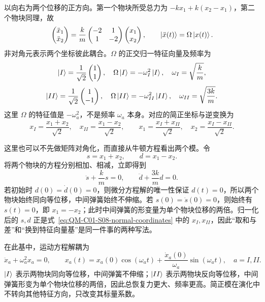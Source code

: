 \begin{checkedsolution}
以向右为两个位移的正方向。第一个物块所受总力为 $-kx_1+k(x_2-x_1)$，第二个物块同理，故
\begin{equation}
  \begin{pmatrix}\ddot x_1\\\ddot x_2\end{pmatrix}
  =\frac{k}{m}
  \begin{pmatrix}-2&1\\1&-2\end{pmatrix}
  \begin{pmatrix}x_1\\x_2\end{pmatrix},
  \qquad
  \left|\ddot x(t)\right\rangle=\Omega\left|x(t)\right\rangle.
  \label{eq:QM-C01-S08-coupled-equation}
\end{equation}
非对角元表示两个坐标彼此耦合。$\Omega$ 的正交归一特征向量及频率为
\[
  \left|I\right\rangle=\frac1{\sqrt2}\begin{pmatrix}1\\1\end{pmatrix},
  \quad \Omega\left|I\right\rangle=-\omega_I^2\left|I\right\rangle,
  \quad \omega_I=\sqrt{\frac{k}{m}},
\]
\[
  \left|II\right\rangle=\frac1{\sqrt2}\begin{pmatrix}1\\-1\end{pmatrix},
  \quad \Omega\left|II\right\rangle=-\omega_{II}^2\left|II\right\rangle,
  \quad \omega_{II}=\sqrt{\frac{3k}{m}}.
\]
这里 $\Omega$ 的特征值是 $-\omega_a^2$，不是频率 $\omega_a$ 本身。对应的简正坐标与逆变换为
\begin{equation}
  x_I=\frac{x_1+x_2}{\sqrt2},
  \quad
  x_{II}=\frac{x_1-x_2}{\sqrt2},
  \qquad
  x_1=\frac{x_I+x_{II}}{\sqrt2},
  \quad
  x_2=\frac{x_I-x_{II}}{\sqrt2}.
  \label{eq:QM-C01-S08-normal-coordinates}
\end{equation}

这里也可以不先做矩阵对角化，而直接从牛顿方程看出两个模。令
\[
  s=x_1+x_2,
  \qquad
  d=x_1-x_2.
\]
将两个物块的方程分别相加、相减，立即得到
\begin{equation}
  \ddot s+\frac{k}{m}s=0,
  \qquad
  \ddot d+\frac{3k}{m}d=0.
  \label{eq:QM-C01-S08-sum-difference}
\end{equation}
若初始时 $d(0)=\dot d(0)=0$，则微分方程解的唯一性保证 $d(t)=0$，所以两个物块始终同向等位移，中间弹簧始终不伸缩。若 $s(0)=\dot s(0)=0$，则始终有 $s(t)=0$，即 $x_1=-x_2$；此时中间弹簧的形变量为单个物块位移的两倍。归一化后的 $s,d$ 正是式~\eqref{eq:QM-C01-S08-normal-coordinates} 中的 $x_I,x_{II}$，因此“取和与差”和“换到特征向量基”是同一件事的两种写法。

在此基中，运动方程解耦为
\begin{equation}
  \ddot x_a+\omega_a^2x_a=0,
  \qquad
  x_a(t)=x_a(0)\cos(\omega_at)
  +\frac{\dot x_a(0)}{\omega_a}\sin(\omega_at),
  \quad a=I,II.
  \label{eq:QM-C01-S08-normal-mode-solution}
\end{equation}
$\left|I\right\rangle$ 表示两物块同向等位移，中间弹簧不伸缩；$\left|II\right\rangle$ 表示两物块反向等位移，中间弹簧形变为单个物块位移的两倍，因此总恢复力更大、频率更高。简正模在演化中不转向其他特征方向，只改变其标量系数。


\end{checkedsolution}
